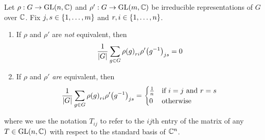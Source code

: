 \begin{lemma}
    Let $\rho : G \to \operatorname{GL}\!\left( n, \mathbb{C} \right)$ and $\rho' : G \to \operatorname{GL}\!\left( m, \mathbb{C} \right)$ be irreducible representations of $G$ over $\mathbb{C}$. Fix $j, s \in \left\{ 1, \ldots, m \right\}$ and $r, i \in \left\{ 1, \ldots, n \right\}$.
    \begin{enumerate}[label = \normalfont \arabic*., noitemsep]
        \item If $\rho$ and $\rho'$ are \textit{not} equivalent, then
        \begin{align*}
            \frac{1}{\left\lvert G \right\rvert} \sum_{g \in G} {\rho(g)}_{ri} {\rho'\!\left( g^{-1} \right)}_{js} = 0
        \end{align*}

        \item If $\rho$ and $\rho'$ \textit{are} equivalent, then
        \begin{align*}
            \frac{1}{\left\lvert G \right\rvert} \sum_{g \in G} {\rho(g)}_{ri} {\rho'\!\left( g^{-1} \right)}_{js} =
            \begin{cases}
                \frac{1}{n} & \text{if } i = j \text{ and } r = s \\
                0 & \text{otherwise}
            \end{cases}
        \end{align*}
    \end{enumerate}
    where we use the notation $T_{ij}$ to refer to the $ij$th entry of the matrix of any $T \in \operatorname{GL}\!\left( n, \mathbb{C} \right)$ with respect to the standard basis of $\mathbb{C}^n$.
\end{lemma}
